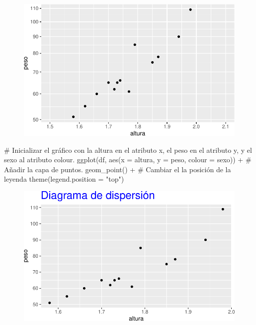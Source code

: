 \documentclass[
  a4paper,
]{scrreport}
\newenvironment{Shaded}{\begin{snugshade}}{\end{snugshade}}
\newcommand{\AttributeTok}[1]{\textcolor[rgb]{0.40,0.45,0.13}{#1}}
\newcommand{\CommentTok}[1]{\textcolor[rgb]{0.37,0.37,0.37}{#1}}
\newcommand{\FunctionTok}[1]{\textcolor[rgb]{0.28,0.35,0.67}{#1}}
\newcommand{\NormalTok}[1]{\textcolor[rgb]{0.00,0.23,0.31}{#1}}
\newcommand{\SpecialCharTok}[1]{\textcolor[rgb]{0.37,0.37,0.37}{#1}}
\newcommand{\StringTok}[1]{\textcolor[rgb]{0.13,0.47,0.30}{#1}}
\theoremstyle{definition}
\theoremstyle{definition}
\theoremstyle{remark}
\begin{document}
\begin{figure}[H]

{\centering \includegraphics{./07-graficos_files/figure-pdf/unnamed-chunk-29-1.pdf}

}

\end{figure}

\begin{Shaded}
\begin{Highlighting}[]
\CommentTok{\# Inicializar el gráfico con la altura en el atributo x, el peso en el atributo y, y el sexo al atributo colour.}
\FunctionTok{ggplot}\NormalTok{(df, }\FunctionTok{aes}\NormalTok{(}\AttributeTok{x =}\NormalTok{ altura, }\AttributeTok{y =}\NormalTok{ peso, }\AttributeTok{colour =}\NormalTok{ sexo)) }\SpecialCharTok{+}
\CommentTok{\# Añadir la capa de puntos.}
    \FunctionTok{geom\_point}\NormalTok{() }\SpecialCharTok{+}
\CommentTok{\# Cambiar el la posición de la leyenda}
    \FunctionTok{theme}\NormalTok{(}\AttributeTok{legend.position =} \StringTok{"top"}\NormalTok{)}
\end{Highlighting}
\end{Shaded}

\begin{figure}[H]

{\centering \includegraphics{./07-graficos_files/figure-pdf/unnamed-chunk-30-1.pdf}

}

\end{figure}
\end{document}
